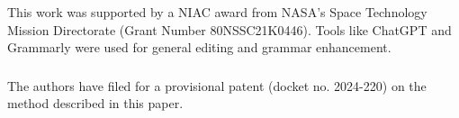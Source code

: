 \documentclass[runningheads]{llncs}
\begin{document}


\begin{credits}
\subsubsection{\ackname} This work was supported by a NIAC award from NASA’s Space Technology Mission Directorate (Grant Number 80NSSC21K0446). Tools like ChatGPT and Grammarly were used for general editing and grammar enhancement. 

\subsubsection{\discintname}
 The authors have filed for a provisional patent (docket no. 2024-220) on the method described in this paper. 
\end{credits}
%
%
%


%
\end{document}
